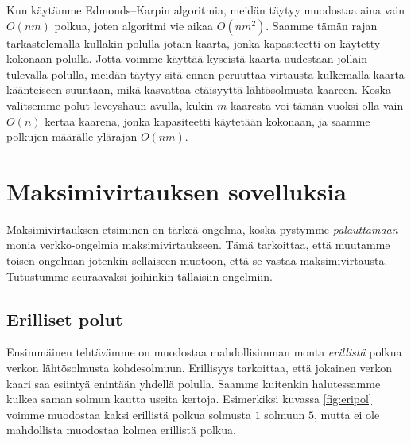 Kun käytämme Edmonds–Karpin algoritmia,
meidän täytyy muodostaa aina vain $O(nm)$ polkua,
joten algoritmi vie aikaa $O(nm^2)$.
Saamme tämän rajan tarkastelemalla kullakin polulla
jotain kaarta, jonka kapasiteetti on käytetty kokonaan polulla.
Jotta voimme käyttää kyseistä kaarta uudestaan jollain tulevalla polulla,
meidän täytyy sitä ennen peruuttaa virtausta
kulkemalla kaarta käänteiseen suuntaan,
mikä kasvattaa etäisyyttä lähtösolmusta kaareen.
Koska valitsemme polut leveyshaun avulla,
kukin $m$ kaaresta voi tämän vuoksi olla vain $O(n)$ 
kertaa kaarena, jonka kapasiteetti käytetään kokonaan,
ja saamme polkujen määrälle ylärajan $O(nm)$.

\section{Maksimivirtauksen sovelluksia}


Maksimivirtauksen etsiminen on tärkeä ongelma,
koska pystymme \emph{palauttamaan} monia verkko-ongelmia maksimivirtaukseen.
Tämä tarkoittaa, että muutamme toisen ongelman jotenkin
sellaiseen muotoon, että se vastaa maksimivirtausta.
Tutustumme seuraavaksi joihinkin tällaisiin ongelmiin.

\subsection{Erilliset polut}


Ensimmäinen tehtävämme on muodostaa mahdollisimman monta
\emph{erillistä} polkua verkon lähtösolmusta kohdesolmuun.
Erillisyys tarkoittaa, että jokainen verkon kaari saa esiintyä
enintään yhdellä polulla.
Saamme kuitenkin halutessamme kulkea saman solmun kautta useita kertoja.
Esimerkiksi kuvassa \ref{fig:eripol} voimme muodostaa
kaksi erillistä polkua solmusta $1$ solmuun $5$,
mutta ei ole mahdollista muodostaa kolmea erillistä polkua.

